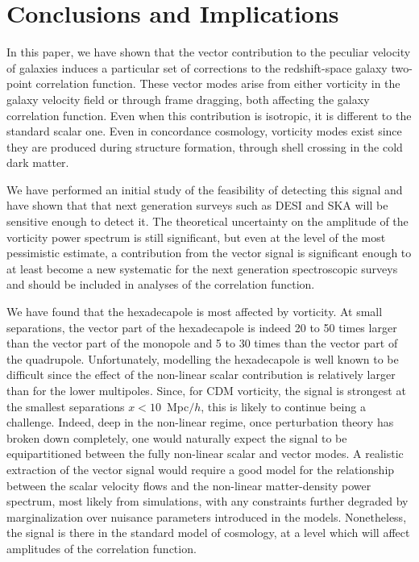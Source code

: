 \documentclass[a4paper,twocolumn,aps,prd,nolongbibliography,superscriptaddress,showpacs,showkeys,amsmath,amssymb,floatfix,nofootinbib]{revtex4-1}
\renewcommand{\[}{\begin{equation}}
\renewcommand{\]}{\end{equation}}
\begin{document}
\section{Conclusions and Implications}

In this paper, we have shown that the vector contribution to the peculiar velocity of galaxies induces a particular set of corrections to the redshift-space galaxy two-point correlation function. These vector modes arise from either vorticity in the galaxy velocity field or through frame dragging, both affecting the galaxy correlation function. Even when this contribution is isotropic, it is different to the standard scalar one. Even in concordance cosmology, vorticity modes exist since they are produced during structure formation, through shell crossing in the cold dark matter.

We have performed an initial study of the feasibility of detecting this signal and have shown that that next generation surveys such as DESI and SKA will be sensitive enough to detect it. The theoretical uncertainty on the  amplitude of the vorticity power spectrum is still significant, but even at the level of the most pessimistic estimate, a contribution from the vector signal is significant enough to at least become a new systematic for the next generation spectroscopic surveys and should be included in analyses of the correlation function.

We have found that the hexadecapole is most affected by vorticity. At small separations, the vector part of the hexadecapole is indeed 20 to 50 times larger than the vector part of the monopole and 5 to 30 times than the vector part of the quadrupole. Unfortunately, modelling the hexadecapole is well known to be difficult since the effect of the non-linear scalar contribution is relatively larger than for the lower multipoles. Since, for CDM vorticity, the signal is strongest at the smallest separations $x<10$~Mpc$/h$, this is likely to continue being  a challenge. Indeed, deep in the non-linear regime, once perturbation theory has broken down completely, one would naturally expect the signal to be equipartitioned between the fully non-linear scalar and vector modes. A realistic extraction of the vector signal would require a good model for the relationship between the scalar velocity flows and the non-linear matter-density power spectrum, most likely from simulations, with any constraints further degraded by marginalization over nuisance parameters introduced in the models. Nonetheless, the signal is there in the standard model of cosmology, at a level which will affect amplitudes of the correlation function.
	
\end{document}
